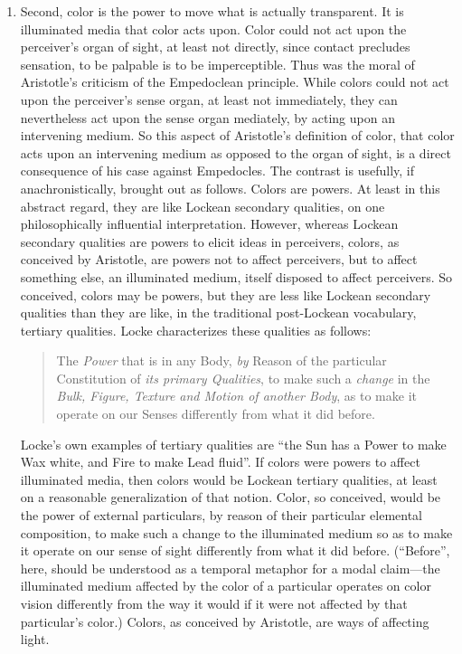 \begin{enumerate}[(1)]
	\item Second, color is the power to move what is actually transparent. It is illuminated media that color acts upon. Color could not act upon the perceiver's organ of sight, at least not directly, since contact precludes sensation, to be palpable is to be imperceptible. Thus was the moral of Aristotle's criticism of the Empedoclean principle. While colors could not act upon the perceiver's sense organ, at least not immediately, they can nevertheless act upon the sense organ mediately, by acting upon an intervening medium. So this aspect of Aristotle's definition of color, that color acts upon an intervening medium as opposed to the organ of sight, is a direct consequence of his case against Empedocles. The contrast is usefully, if anachronistically, brought out as follows. Colors are powers. At least in this abstract regard, they are like Lockean secondary qualities, on one philosophically influential interpretation. However, whereas Lockean secondary qualities are powers to elicit ideas in perceivers, colors, as conceived by Aristotle, are powers not to affect perceivers, but to affect something else, an illuminated medium, itself disposed to affect perceivers. So conceived, colors may be powers, but they are less like Lockean secondary qualities than they are like, in the traditional post-Lockean vocabulary, tertiary qualities. Locke characterizes these qualities as follows: 
\begin{quote}
	The \emph{Power} that is in any Body, \emph{by} Reason of the particular Constitution of \emph{its primary Qualities}, to make such a \emph{change} in the \emph{Bulk, Figure, Texture and Motion of another Body}, as to make it operate on our Senses differently from what it did before. \citep[\textsc{ii}.8.23]{Locke:1706hc} 
\end{quote}
Locke's \citeyearpar[\textsc{ii} 8 23]{Locke:1706hc} own examples of tertiary qualities are ``the Sun has a Power to make Wax white, and Fire to make Lead fluid''. If colors were powers to affect illuminated media, then colors would be Lockean tertiary qualities, at least on a reasonable generalization of that notion. Color, so conceived, would be the power of external particulars, by reason of their particular elemental composition, to make such a change to the illuminated medium so as to make it operate on our sense of sight differently from what it did before. (``Before'', here, should be understood as a temporal metaphor for a modal claim---the illuminated medium affected by the color of a particular operates on color vision differently from the way it would if it were not affected by that particular's color.) Colors, as conceived by Aristotle, are ways of affecting light.

\end{enumerate}
